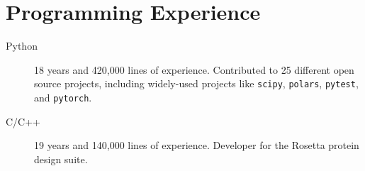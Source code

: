 \section{Programming Experience\protect\footnotemark}

\begin{description}

\item[Python] 
        18 years and 420,000 lines of experience.  Contributed to 25 different open source projects, including widely-used projects like  \texttt{scipy}, \texttt{polars}, \texttt{pytest}, and \texttt{pytorch}.

\item[C/C++]
        19 years and 140,000 lines of experience.  Developer for the Rosetta 
        protein design suite.

\end{description}


